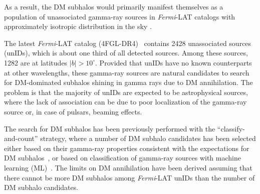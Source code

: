 \documentclass[12pt, a4paper]{article}
\newcommand{\dima}[1]{\textcolor{purple}{{Dima: #1}}}
\newcommand{\Fermi}{{\textit{Fermi}}}
\newcommand{\DMsubhaloUnas}{\cite{2010PhRvD..82f3501B, 2012A&A...538A..93Z, 2012ApJ...747..121A, 2012JCAP...11..050Z, 2012PhRvD..86d3504B, 2014GrCo...20...47B, 2014PhRvD..89a6014B, 2015JCAP...12..035B, 2016JCAP...05..028S, 2016ApJ...825...69M, 2017JCAP...04..018H, 2017PhRvD..96f3009C,  2019Galax...7...90C, 2019JCAP...11..045C, 
2019JCAP...07..020C, 2022PhRvD.105h3006C, 2023JCAP...07..033B,  2023MNRAS.520.1348G}}
\newcommand{\DMsubhaloML}{\cite{2016ApJ...825...69M, 2019JCAP...11..045C, 2023JCAP...07..033B, 2023MNRAS.520.1348G}}
\newcommand{\DMsubhaloHand}{\cite{2010PhRvD..82f3501B, 2012A&A...538A..93Z, 2012ApJ...747..121A, 2012JCAP...11..050Z, 2012PhRvD..86d3504B, 2014PhRvD..89a6014B, 2015JCAP...12..035B, 2016JCAP...05..028S, 2017JCAP...04..018H, 2017PhRvD..96f3009C, 2019JCAP...07..020C, 2019JCAP...11..045C}}
\begin{document}
As a result, the DM subhalos would primarily manifest themselves as a population of unassociated gamma-ray sources in {\Fermi}-LAT catalogs with approximately isotropic distribution in the sky 
\DMsubhaloUnas.

The latest \Fermi-LAT catalog (4FGL-DR4)~\cite{2022ApJS..260...53A, 2023arXiv230712546B} contains 2428 unassociated sources (unIDs), which is about one third of all detected sources.
Among these sources, 1282 are at latitudes $|b| > 10^\circ$.
Provided that unIDs have no known counterparts at other wavelengths, these gamma-ray sources are natural candidates to search for DM-dominated subhalos shining in gamma rays
due to DM annihilation.
The problem is that the majority of unIDs are expected to be astrophysical sources, where the lack of association can be due to poor localization of the gamma-ray source or, in case of pulsars, beaming effects.

The search for DM subhalos 
has been previously performed with the ``classify-and-count'' strategy, where a number of DM subhalo candidates has been selected either based on their gamma-ray properties 
consistent with the expectations for DM subhalos~\DMsubhaloHand, or based on classification of gamma-ray sources with machine learning (ML)~\DMsubhaloML.
The limits on DM annihilation have been derived assuming that there cannot be more DM subhalos among \Fermi-LAT unIDs than the number of DM subhalo candidates.
\end{document}
